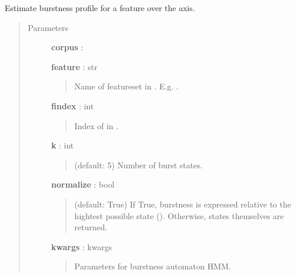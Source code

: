 \documentclass[letterpaper,10pt,english]{sphinxmanual}
\begin{document}
\begin{fulllineitems}
\label{tethne.analyze.corpus:tethne.analyze.corpus.feature_burstness}
Estimate burstness profile for a feature over the  axis.
\begin{quote}\begin{description}
\item[{Parameters}] \leavevmode
\textbf{corpus} : {\hyperref[tethne.classes.corpus:tethne.classes.corpus.Corpus]{}}

\textbf{feature} : str
\begin{quote}

Name of featureset in . E.g. .
\end{quote}

\textbf{findex} : int
\begin{quote}

Index of  in .
\end{quote}

\textbf{k} : int
\begin{quote}

(default: 5) Number of burst states.
\end{quote}

\textbf{normalize} : bool
\begin{quote}

(default: True) If True, burstness is expressed relative to the hightest
possible state (). Otherwise, states themselves are returned.
\end{quote}

\textbf{kwargs} : kwargs
\begin{quote}

Parameters for burstness automaton HMM.
\end{quote}

\end{description}\end{quote}

\end{fulllineitems}

\end{document}
